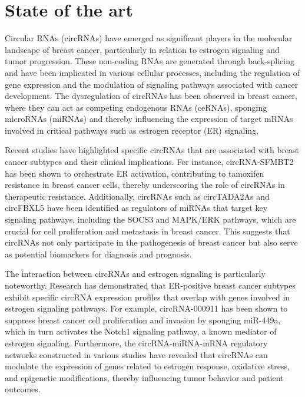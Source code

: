 \section{State of the art}
Circular RNAs (circRNAs) have emerged as significant players in the molecular
landscape of breast cancer, particularly in relation to estrogen signaling and
tumor progression. These non-coding RNAs are generated through back-splicing and
have been implicated in various cellular processes, including the regulation of
gene expression and the modulation of signaling pathways associated with cancer
development\supercite{li_circrna-sfmbt2_2023,tran_new_2020}. The dysregulation
of circRNAs has
been observed in breast cancer, where they can act as competing endogenous RNAs
(ceRNAs), sponging microRNAs (miRNAs) and thereby influencing the expression of
target mRNAs involved in critical pathways such as estrogen receptor (ER)
signaling\supercite{nair_circular_2016,xu_circrna_2022}.

Recent studies have highlighted specific circRNAs that are associated with
breast cancer subtypes and their clinical implications. For instance,
circRNA-SFMBT2 has been shown to orchestrate ER\textalpha{} activation, contributing to
tamoxifen resistance in breast cancer cells, thereby underscoring the role of
circRNAs in therapeutic resistance\supercite{li_circrna-sfmbt2_2023}. Additionally, circRNAs such as
circTADA2As and circFBXL5 have been identified as regulators of miRNAs that
target key signaling pathways, including the SOCS3 and MAPK/ERK pathways, which
are crucial for cell proliferation and metastasis in breast
cancer\supercite{xu_circtada2as_2019,gao_hsa_circrna_0006528_2019}. This
suggests that circRNAs not only participate in the
pathogenesis of breast cancer but also serve as potential biomarkers for
diagnosis and prognosis\supercite{liu_influence_2021,chen_circepsti1_2018}.

The interaction between circRNAs and estrogen signaling is particularly
noteworthy. Research has demonstrated that ER-positive breast cancer subtypes
exhibit specific circRNA expression profiles that overlap with genes involved in
estrogen signaling pathways\supercite{nair_circular_2016}. For example, circRNA-000911 has
been shown to suppress breast cancer cell proliferation and invasion by sponging
miR-449a, which in turn activates the Notch1 signaling pathway, a known mediator
of estrogen signaling\supercite{wang_comprehensive_2018}. Furthermore, the circRNA-miRNA-mRNA
regulatory networks constructed in various studies have revealed that circRNAs
can modulate the expression of genes related to estrogen response, oxidative
stress, and epigenetic modifications, thereby influencing tumor behavior and
patient outcomes\supercite{xu_circrna_2022,nair_circular_2016}.
